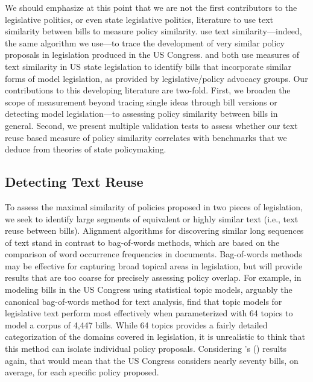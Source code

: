 \documentclass[12pt]{article} %
\def\citeapos#1{\citeauthor{#1}'s (\citeyear{#1})}
\begin{document}
We should emphasize at this point that we are not the first contributors to the legislative politics, or even state legislative politics, literature to use text similarity between bills to measure policy similarity. \citet{wilkerson2015tracing} use text similarity---indeed, the same algorithm we use---to trace the development of very similar policy proposals in legislation produced in the US Congress. \cite{garrett2015} and \cite{burgess2016legislative} both use measures of text similarity in US state legislation to identify bills that incorporate similar forms of model legislation, as provided by legislative/policy advocacy groups. Our contributions to this developing literature are two-fold. First, we broaden the scope of measurement beyond tracing single ideas through bill versions or detecting model legislation---to assessing policy similarity between bills in general. Second, we present multiple validation tests to assess whether our text reuse based measure of policy similarity correlates with benchmarks that we deduce from theories of state policymaking.

\subsection{Detecting Text Reuse}
\label{sec:d_t_r}
To assess the maximal similarity of policies proposed in two pieces of legislation, we seek to identify large segments of equivalent or highly similar text (i.e., text reuse between bills). Alignment algorithms for discovering similar long sequences of text stand in contrast to bag-of-words methods, which are based on the comparison of word occurrence frequencies in documents. Bag-of-words methods may be effective for capturing broad topical areas in legislation, but will provide results that are too coarse for precisely assessing policy overlap. For example, in modeling bills in the US Congress using statistical topic models, arguably the canonical bag-of-words method for text analysis, \citet{gerrish2011predicting} find that topic models for legislative text perform most effectively when parameterized with 64 topics to model a corpus of 4,447 bills. While 64 topics provides a fairly detailed categorization of the domains covered in legislation, it is unrealistic to think that this method can isolate individual policy proposals.  Considering \citeapos{gerrish2011predicting} results again, that would mean that the US Congress considers nearly seventy bills, on average, for each specific policy proposed. 
\end{document}
